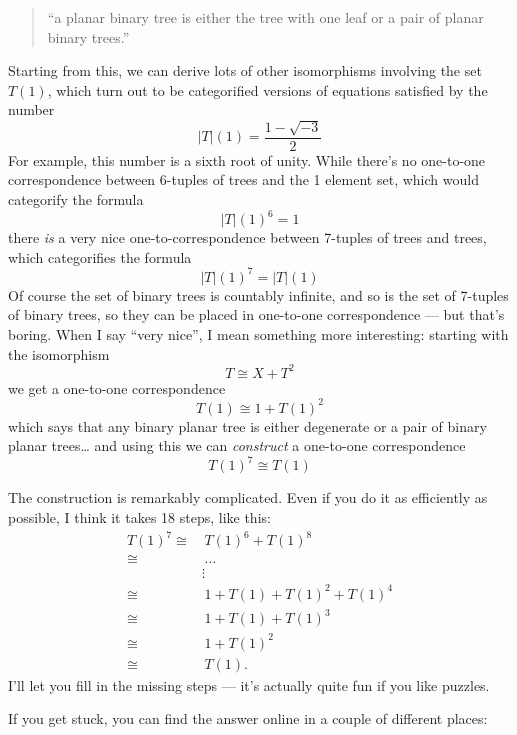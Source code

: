 \documentclass{article}
\renewcommand{\texttt}[1]{%
  \begingroup
  \ttfamily
  \begingroup\lccode`~=`/\lowercase{\endgroup\def~}{/\discretionary{}{}{}}%
  \begingroup\lccode`~=`[\lowercase{\endgroup\def~}{[\discretionary{}{}{}}%
  \begingroup\lccode`~=`.\lowercase{\endgroup\def~}{.\discretionary{}{}{}}%
  \catcode`/=\active\catcode`[=\active\catcode`.=\active
  \scantokens{#1\noexpand}%
  \endgroup
}
\begin{document}
\begin{quote}
``a planar binary tree is either the tree with one leaf or a pair of
planar binary trees.''
\end{quote}

Starting from this, we can derive lots of other isomorphisms involving
the set \(T(1)\), which turn out to be categorified versions of
equations satisfied by the number \[|T|(1) = \frac{1-\sqrt{-3}}{2}\] For
example, this number is a sixth root of unity. While there's no
one-to-one correspondence between \(6\)-tuples of trees and the 1
element set, which would categorify the formula \[|T|(1)^6 = 1\] there
\emph{is} a very nice one-to-correspondence between 7-tuples of trees
and trees, which categorifies the formula \[|T|(1)^7 = |T|(1)\] Of
course the set of binary trees is countably infinite, and so is the set
of 7-tuples of binary trees, so they can be placed in one-to-one
correspondence --- but that's boring. When I say ``very nice'', I mean
something more interesting: starting with the isomorphism
\[T \cong X + T^2\] we get a one-to-one correspondence
\[T(1) \cong 1 + T(1)^2\] which says that any binary planar tree is
either degenerate or a pair of binary planar trees\ldots{} and using
this we can \emph{construct} a one-to-one correspondence
\[T(1)^7 \cong T(1)\]

The construction is remarkably complicated. Even if you do it as
efficiently as possible, I think it takes 18 steps, like this: \[
  \begin{aligned}
    T(1)^7
    \cong&\, T(1)^6 + T(1)^8
  \\\cong&\, \ldots
  \\&\vdots
  \\\cong&\, 1 + T(1) + T(1)^2 + T(1)^4
  \\\cong&\, 1 + T(1) + T(1)^3
  \\\cong&\, 1 + T(1)^2
  \\\cong&\, T(1).
  \end{aligned}
\] I'll let you fill in the missing steps --- it's actually quite fun if
you like puzzles.

If you get stuck, you can find the answer online in a couple of
different places:

\end{document}
